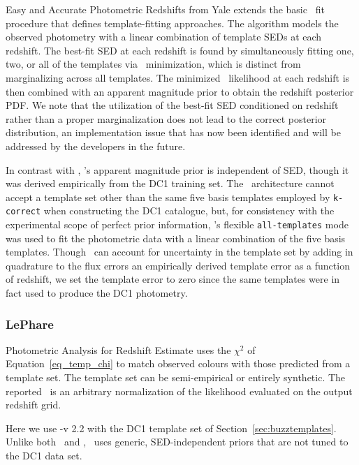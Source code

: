 Easy and Accurate Photometric Redshifts from Yale \citep[\eazy,][]{Brammer:08} extends the basic \chisq\ fit procedure that defines template-fitting approaches.
The algorithm models the observed photometry with a linear combination of template SEDs at each redshift.
The best-fit SED at each redshift is found by simultaneously fitting one, two, or all of the templates via \chisq\ minimization, which is distinct from marginalizing across all templates.
The minimized \chisq\ likelihood at each redshift is then combined with an apparent magnitude prior to obtain the redshift posterior PDF.
We note that the utilization of the best-fit SED conditioned on redshift rather than a proper marginalization does not lead to the correct posterior distribution, an implementation issue that has now been identified and will be addressed by the developers in the future.

In contrast with \bpz, \eazy's apparent magnitude prior is independent of SED, though it was derived empirically from the DC1 training set.
The \eazy\ architecture cannot accept a template set other than the same five basis templates employed by \texttt{k-correct} when constructing the DC1 catalogue, but, for consistency with the experimental scope of perfect prior information, \eazy's flexible \texttt{all-templates} mode was used to fit the photometric data with a linear combination of the five basis templates.
Though \eazy\ can account for uncertainty in the template set by adding in quadrature to the flux errors an empirically derived template error as a function of redshift, we set the template error to zero since the same templates were in fact used to produce the DC1 photometry.

\subsubsection{LePhare}
\label{sec:lephare}

Photometric Analysis for Redshift Estimate \citep[\lephare,][]{Arnouts:99,Ilbert:06} uses the $\chi^2$ of Equation~\ref{eq_temp_chi} to match observed colours with those predicted from a template set.
The template set can be semi-empirical or entirely synthetic.
The reported \pzpdf\ is an arbitrary normalization of the likelihood evaluated on the output redshift grid.

Here we use \lephare-v 2.2 with the DC1 template set of Section~\ref{sec:buzztemplates}.
Unlike both \bpz\ and \eazy, \lephare\ uses generic, SED-independent priors that are not tuned to the DC1 data set.

